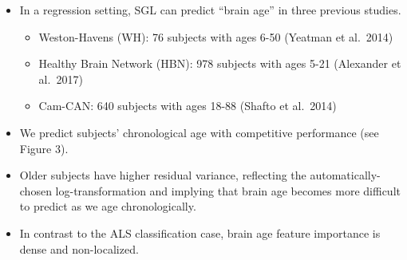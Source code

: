 \documentclass[a0paper,landscape,fontscale=0.395]{baposter}
\begin{document}
\begin{poster}
{\begin{itemize}[noitemsep, leftmargin=*]
    \item In a regression setting, SGL can predict ``brain age'' in three previous studies.
    \begin{itemize}[noitemsep, leftmargin=*]
        \item Weston-Havens (WH): 76 subjects with ages 6-50 (Yeatman et al.~2014)
        \item Healthy Brain Network (HBN): 978 subjects with ages 5-21 (Alexander et al.~2017)
        \item Cam-CAN: 640 subjects with ages 18-88 (Shafto et al.~2014)
    \end{itemize}
    \item We predict subjects' chronological age with competitive performance (see Figure 3).
    \item Older subjects have higher residual variance, reflecting the automatically-chosen log-transformation and implying that brain age becomes more difficult to predict as we age chronologically.
    \item In contrast to the ALS classification case, brain age feature importance is dense and non-localized.
\end{itemize}

}
\end{poster}
\end{document}
